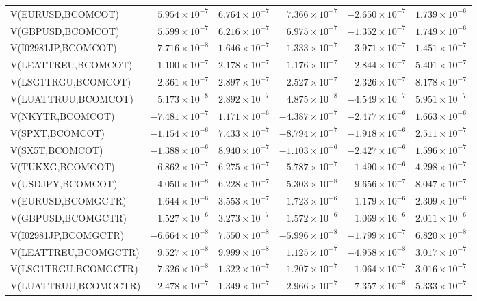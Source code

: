 \documentclass[10pt,a4paper]{article}
\begin{document}
\begin{tabular*}{\linewidth}{@{\extracolsep{\fill}}lrrrrr@{}}
V(EURUSD,BCOMCOT) & $5.954\times10^{-7}$ & $6.764\times10^{-7}$ & $7.366\times10^{-7}$ & $-2.650\times10^{-7}$ & $1.739\times10^{-6}$ \\
V(GBPUSD,BCOMCOT) & $5.599\times10^{-7}$ & $6.216\times10^{-7}$ & $6.975\times10^{-7}$ & $-1.352\times10^{-7}$ & $1.749\times10^{-6}$ \\
V(I02981JP,BCOMCOT) & $-7.716\times10^{-8}$ & $1.646\times10^{-7}$ & $-1.333\times10^{-7}$ & $-3.971\times10^{-7}$ & $1.451\times10^{-7}$ \\
V(LEATTREU,BCOMCOT) & $1.100\times10^{-7}$ & $2.178\times10^{-7}$ & $1.176\times10^{-7}$ & $-2.844\times10^{-7}$ & $5.401\times10^{-7}$ \\
V(LSG1TRGU,BCOMCOT) & $2.361\times10^{-7}$ & $2.897\times10^{-7}$ & $2.527\times10^{-7}$ & $-2.326\times10^{-7}$ & $8.178\times10^{-7}$ \\
V(LUATTRUU,BCOMCOT) & $5.173\times10^{-8}$ & $2.892\times10^{-7}$ & $4.875\times10^{-8}$ & $-4.549\times10^{-7}$ & $5.951\times10^{-7}$ \\
V(NKYTR,BCOMCOT) & $-7.481\times10^{-7}$ & $1.171\times10^{-6}$ & $-4.387\times10^{-7}$ & $-2.477\times10^{-6}$ & $1.663\times10^{-6}$ \\
V(SPXT,BCOMCOT) & $-1.154\times10^{-6}$ & $7.433\times10^{-7}$ & $-8.794\times10^{-7}$ & $-1.918\times10^{-6}$ & $2.511\times10^{-7}$ \\
V(SX5T,BCOMCOT) & $-1.388\times10^{-6}$ & $8.940\times10^{-7}$ & $-1.103\times10^{-6}$ & $-2.427\times10^{-6}$ & $1.596\times10^{-7}$ \\
V(TUKXG,BCOMCOT) & $-6.862\times10^{-7}$ & $6.275\times10^{-7}$ & $-5.787\times10^{-7}$ & $-1.490\times10^{-6}$ & $4.298\times10^{-7}$ \\
V(USDJPY,BCOMCOT) & $-4.050\times10^{-8}$ & $6.228\times10^{-7}$ & $-5.303\times10^{-8}$ & $-9.656\times10^{-7}$ & $8.047\times10^{-7}$ \\
V(EURUSD,BCOMGCTR) & $1.644\times10^{-6}$ & $3.553\times10^{-7}$ & $1.723\times10^{-6}$ & $1.179\times10^{-6}$ & $2.309\times10^{-6}$ \\
V(GBPUSD,BCOMGCTR) & $1.527\times10^{-6}$ & $3.273\times10^{-7}$ & $1.572\times10^{-6}$ & $1.069\times10^{-6}$ & $2.011\times10^{-6}$ \\
V(I02981JP,BCOMGCTR) & $-6.664\times10^{-8}$ & $7.550\times10^{-8}$ & $-5.996\times10^{-8}$ & $-1.799\times10^{-7}$ & $6.820\times10^{-8}$ \\
V(LEATTREU,BCOMGCTR) & $9.527\times10^{-8}$ & $9.999\times10^{-8}$ & $1.125\times10^{-7}$ & $-4.958\times10^{-8}$ & $3.017\times10^{-7}$ \\
V(LSG1TRGU,BCOMGCTR) & $7.326\times10^{-8}$ & $1.322\times10^{-7}$ & $1.207\times10^{-7}$ & $-1.064\times10^{-7}$ & $3.016\times10^{-7}$ \\
V(LUATTRUU,BCOMGCTR) & $2.478\times10^{-7}$ & $1.349\times10^{-7}$ & $2.966\times10^{-7}$ & $7.357\times10^{-8}$ & $5.333\times10^{-7}$ \\
\bottomrule
\end{tabular*}\endgroup
\end{document}
